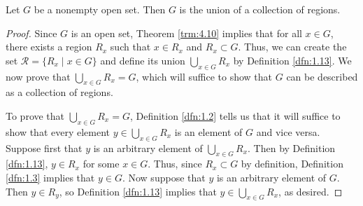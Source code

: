 \documentclass[../main.tex]{subfiles}
\begin{document}
\begin{theorem}\label{trm:4.14}
    Let $G$ be a nonempty open set. Then $G$ is the union of a collection of regions.
    \begin{proof}
        Since $G$ is an open set, Theorem \ref{trm:4.10} implies that for all $x\in G$, there exists a region $R_x$ such that $x\in R_x$ and $R_x\subset G$. Thus, we can create the set $\mathcal{R}=\{R_x\mid x\in G\}$ and define its union $\bigcup_{x\in G}R_x$ by Definition \ref{dfn:1.13}. We now prove that $\bigcup_{x\in G}R_x=G$, which will suffice to show that $G$ can be described as a collection of regions.\par
        To prove that $\bigcup_{x\in G}R_x=G$, Definition \ref{dfn:1.2} tells us that it will suffice to show that every element $y\in\bigcup_{x\in G}R_x$ is an element of $G$ and vice versa. Suppose first that $y$ is an arbitrary element of $\bigcup_{x\in G}R_x$. Then by Definition \ref{dfn:1.13}, $y\in R_x$ for some $x\in G$. Thus, since $R_x\subset G$ by definition, Definition \ref{dfn:1.3} implies that $y\in G$. Now suppose that $y$ is an arbitrary element of $G$. Then $y\in R_y$, so Definition \ref{dfn:1.13} implies that $y\in\bigcup_{x\in G}R_x$, as desired.
    \end{proof}
\end{theorem}
\end{document}
